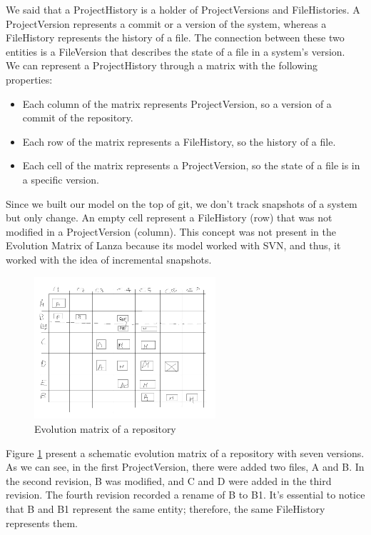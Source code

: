 We said that a ProjectHistory is a holder of ProjectVersions and FileHistories. 
A ProjectVersion represents a commit or a version of the system, whereas a FileHistory represents the history of a file. 
The connection between these two entities is a FileVersion that describes the state of a file in a system's version. \\
We can represent a ProjectHistory through a matrix with the following properties: 
\begin{itemize}
    \item Each column of the matrix represents ProjectVersion, so a version of a commit of the repository. 
    \item Each row of the matrix represents a FileHistory, so the history of a file. 
    \item Each cell of the matrix represents a ProjectVersion, so the state of a file is in a specific version. 
\end{itemize}

Since we built our model on the top of git, we don't track snapshots of a system but only change. 
An empty cell represent a FileHistory (row) that was not modified in a ProjectVersion (column). 
This concept was not present in the Evolution Matrix of Lanza because its model worked with SVN, and thus, it worked with the idea of incremental snapshots.  

\begin{figure}
    \center
    \includegraphics[width=0.6\textwidth]{ApproachMatrix.jpg}
    \caption{Evolution matrix of a repository}
    \label{fig:evolutionMatrixApproach}
\end{figure}
Figure \ref{fig:evolutionMatrixApproach} present a schematic evolution matrix of a repository with seven versions.
As we can see, in the first ProjectVersion, there were added two files, A and B. In the second revision, B was modified, and C and D were added in the third revision.
The fourth revision recorded a rename of B to B1.
It's essential to notice that B and B1 represent the same entity; therefore, the same FileHistory represents them.\\

